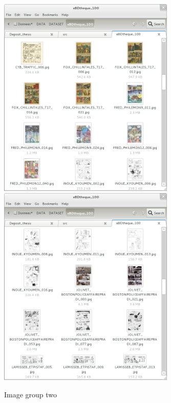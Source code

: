   \begin{figure}[h!]  %
    \centering
    
    \includegraphics[trim= 5px 10px 30px 152px, clip, width=0.75\textwidth]{thumb_03.png}
    \\
    \includegraphics[trim= 5px 10px 30px 152px, clip, width=0.75\textwidth]{thumb_04.png}
    \caption{Image group two}
    \label{fig:app:3_4}
  \end{figure}

